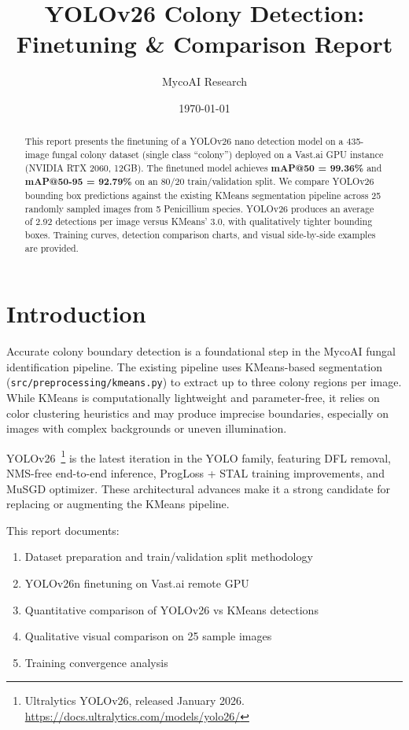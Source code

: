\documentclass[11pt,a4paper]{article}
\title{\textbf{YOLOv26 Colony Detection: Finetuning \& Comparison Report}}
\author{MycoAI Research}
\date{\today}
\begin{document}
\maketitle

\begin{abstract}
This report presents the finetuning of a YOLOv26 nano detection model on a 435-image fungal colony dataset (single class ``colony'') deployed on a Vast.ai GPU instance (NVIDIA RTX 2060, 12GB). The finetuned model achieves \textbf{mAP@50 = 99.36\%} and \textbf{mAP@50-95 = 92.79\%} on an 80/20 train/validation split. We compare YOLOv26 bounding box predictions against the existing KMeans segmentation pipeline across 25 randomly sampled images from 5 Penicillium species. YOLOv26 produces an average of 2.92 detections per image versus KMeans' 3.0, with qualitatively tighter bounding boxes. Training curves, detection comparison charts, and visual side-by-side examples are provided.
\end{abstract}

\section{Introduction}

Accurate colony boundary detection is a foundational step in the MycoAI fungal identification pipeline. The existing pipeline uses KMeans-based segmentation (\texttt{src/preprocessing/kmeans.py}) to extract up to three colony regions per image. While KMeans is computationally lightweight and parameter-free, it relies on color clustering heuristics and may produce imprecise boundaries, especially on images with complex backgrounds or uneven illumination.

YOLOv26~\footnote{Ultralytics YOLOv26, released January 2026. \url{https://docs.ultralytics.com/models/yolo26/}} is the latest iteration in the YOLO family, featuring DFL removal, NMS-free end-to-end inference, ProgLoss + STAL training improvements, and MuSGD optimizer. These architectural advances make it a strong candidate for replacing or augmenting the KMeans pipeline.

This report documents:
\begin{enumerate}[nosep]
  \item Dataset preparation and train/validation split methodology
  \item YOLOv26n finetuning on Vast.ai remote GPU
  \item Quantitative comparison of YOLOv26 vs KMeans detections
  \item Qualitative visual comparison on 25 sample images
  \item Training convergence analysis
\end{enumerate}
\end{document}
